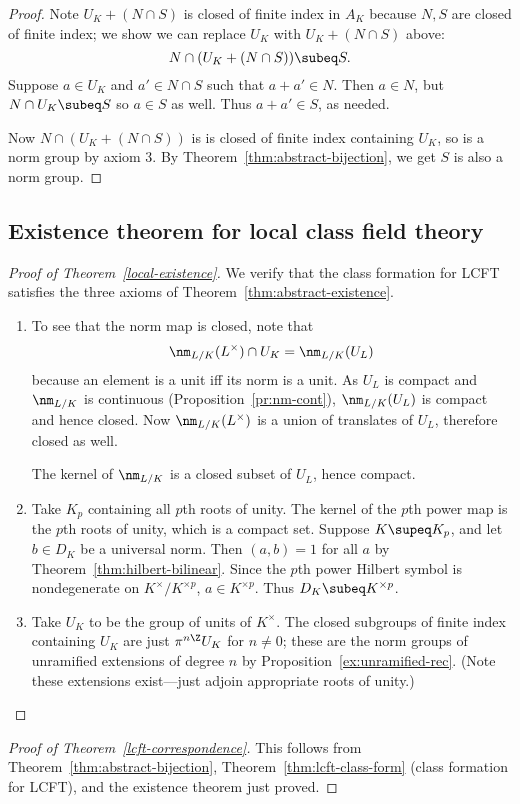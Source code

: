 \begin{proof}
Note $U_K+(N\cap S)$ is closed of finite index in $A_K$ because $N,S$ are closed of finite index; we show we can replace $U_K$ with $U_K+(N\cap S)$ above:
\[
N\cap (U_K+(N\cap S))\subeq S.
\]
Suppose $a\in U_K$ and $a'\in N\cap S$ such that $a+a'\in N$. Then $a\in N$, but $N\cap U_K\subeq S$ so $a\in S$ as well. Thus $a+a'\in S$, as needed. 

Now $N\cap (U_K+(N\cap S))$ is is closed of finite index containing $U_K$, so is a norm group by axiom 3. By Theorem~\ref{thm:abstract-bijection}, we get $S$ is also a norm group.
\end{proof}
\subsection{Existence theorem for local class field theory}
\begin{proof}[Proof of Theorem~\ref{local-existence}]
We verify that the class formation for LCFT satisfies the three axioms of Theorem~\ref{thm:abstract-existence}.
\begin{enumerate}
\item
To see that the norm map is closed, note that
\[
\nm_{L/K}(L^{\times})\cap U_K=\nm_{L/K}(U_L) 
\]
because an element is a unit iff its norm is a unit. As $U_L$ is compact and $\nm_{L/K}$ is continuous (Proposition~\ref{pr:nm-cont}), $\nm_{L/K}(U_L)$ is compact and hence closed. Now $\nm_{L/K}(L^{\times})$ is a union of translates of $U_L$, therefore closed as well. 

The kernel of $\nm_{L/K}$ is a closed subset of $U_L$, hence compact.
\item
Take $K_p$ containing all $p$th roots of unity. The kernel of the $p$th power map is the $p$th roots of unity, which is a compact set. Suppose $K\supeq K_p$, and let $b\in D_K$ be a universal norm. Then $(a,b)=1$ for all $a$ by Theorem~\ref{thm:hilbert-bilinear}. Since the $p$th power Hilbert symbol is nondegenerate on $K^{\times}/K^{\times p}$, $a\in K^{\times p}$. Thus $D_K\subeq K^{\times p}$.
\item
Take $U_K$ to be the group of units of $K^{\times}$. The closed subgroups of finite index containing $U_K$ are just $\pi^{n\Z}U_K$ for $n\ne 0$; these are the norm groups of unramified extensions of degree $n$ by Proposition~\ref{ex:unramified-rec}. (Note these extensions exist---just adjoin appropriate roots of unity.)
\qedhere
\end{enumerate}
\end{proof}
\begin{proof}[Proof of Theorem~\ref{lcft-correspondence}]
This follows from Theorem~\ref{thm:abstract-bijection}, Theorem~\ref{thm:lcft-class-form} (class formation for LCFT), and the existence theorem just proved.
\end{proof}
